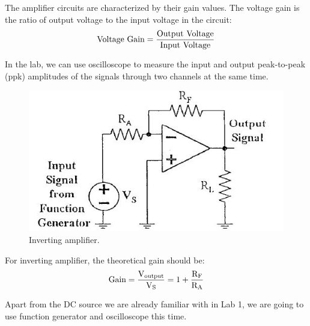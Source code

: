 \documentclass[a4paper]{report}
\begin{document}
	The amplifier circuits are characterized by their gain values. The voltage gain is the ratio of output voltage to the input voltage in the circuit:
	\begin{equation}
	\rm{Voltage\ Gain=\dfrac{Output\ Voltage}{Input\ Voltage}}
	\end{equation}
	
	In the lab, we can use oscilloscope to measure the input and output peak-to-peak (ppk) amplitudes of the signals through two channels at the same time.
	\begin{figure}[H]
		\centering
		\includegraphics[width=0.8\linewidth]{3.jpg}
		\caption{Inverting amplifier.}
	\end{figure}
	For inverting amplifier, the theoretical gain should be:
	\begin{equation}
	\rm{Gain=\dfrac{V_{output}}{V_S}}=1+\dfrac{R_F}{R_A}
	\end{equation}
	
	Apart from the DC source we are already familiar with in Lab 1, we are going to use function generator and oscilloscope this time.
	
\end{document}
